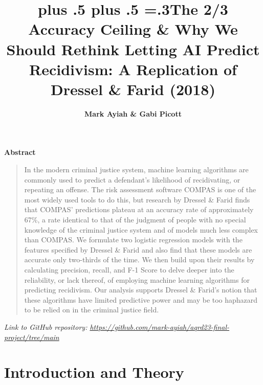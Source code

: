 \documentclass[12pt, ]{article}
\title{\sffamily\bfseries\huge\parfillskip=0pt
\rightskip=0pt plus .5\textwidth
\leftskip=0pt plus .5\textwidth
\emergencystretch=.3\textwidth The 2/3 Accuracy Ceiling \& Why We Should
Rethink Letting AI Predict Recidivism: A Replication of Dressel \& Farid
(2018)}
\author{\textbf{Mark Ayiah \& Gabi Picott}
 }
\date{}
\renewenvironment{abstract}{
  \centerline
  {\large\sffamily\bfseries Abstract}\vspace{-1em}
  \begin{quote}\small
}{
  \end{quote}
}
\begin{document}
\allsectionsfont{\sffamily}

\maketitle

\begin{abstract}
In the modern criminal justice system, machine learning algorithms are
commonly used to predict a defendant's likelihood of recidivating, or
repeating an offense. The risk assessment software COMPAS is one of the
most widely used tools to do this, but research by Dressel \& Farid
finds that COMPAS' predictions plateau at an accuracy rate of
approximately 67\%, a rate identical to that of the judgment of people
with no special knowledge of the criminal justice system and of models
much less complex than COMPAS. We formulate two logistic regression
models with the features specified by Dressel \& Farid and also find
that these models are accurate only two-thirds of the time. We then
build upon their results by calculating precision, recall, and F-1 Score
to delve deeper into the reliability, or lack thereof, of employing
machine learning algorithms for predicting recidivism. Our analysis
supports Dressel \& Farid's notion that these algorithms have limited
predictive power and may be too haphazard to be relied on in the
criminal justice field.
\end{abstract}

\ifdefined\Shaded\renewenvironment{Shaded}{\begin{tcolorbox}[frame hidden, interior hidden, boxrule=0pt, borderline west={3pt}{0pt}{shadecolor}, enhanced, sharp corners, breakable]}{\end{tcolorbox}}\fi




\emph{Link to GitHub repository:
\url{https://github.com/mark-ayiah/aqrd23-final-project/tree/main}}

\hypertarget{introduction-and-theory}{%
\section{Introduction and Theory}\label{introduction-and-theory}}
\end{document}
